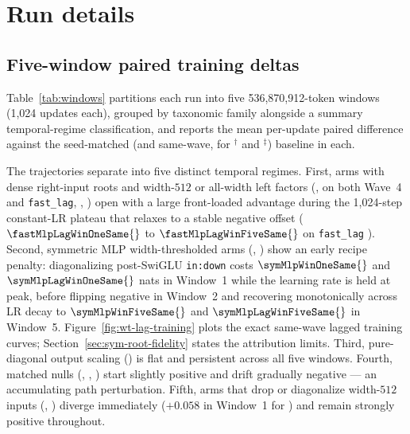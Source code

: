 \section{Run details}
\label{app:runs}

\subsection{Five-window paired training deltas}

Table~\ref{tab:windows} partitions each run into five 536{,}870{,}912-token
windows (1{,}024 updates each), grouped by taxonomic family alongside a
summary temporal-regime classification, and reports the mean per-update paired
difference against the seed-matched (and same-wave, for ${}^{\dagger}$ and
${}^{\ddagger}$) baseline in each.

The trajectories separate into five distinct temporal regimes. First, arms with
dense right-input roots and width-$512$ or all-width left factors
(,  on both Wave~4 and \texttt{fast\_lag},
, ) open with a large front-loaded advantage
during the 1{,}024-step constant-LR plateau that relaxes to a stable negative
offset ($\fastMlpLagWinOneSame{}$ to $\fastMlpLagWinFiveSame{}$ on
\texttt{fast\_lag} ). Second, symmetric MLP width-thresholded
arms (, ) show an early recipe penalty:
diagonalizing post-SwiGLU \texttt{in:down} costs
$\symMlpWinOneSame{}$ and $\symMlpLagWinOneSame{}$ nats in Window~1 while the
learning rate is held at peak, before flipping negative in Window~2 and
recovering monotonically across LR decay to $\symMlpWinFiveSame{}$ and
$\symMlpLagWinFiveSame{}$ in Window~5. Figure~\ref{fig:wt-lag-training} plots
the exact same-wave lagged training curves; Section~\ref{sec:sym-root-fidelity}
states the attribution limits. Third, pure-diagonal output scaling
() is flat and persistent across all five windows. Fourth, matched
nulls (, , ) start slightly
positive and drift gradually negative --- an accumulating path perturbation.
Fifth, arms that drop or diagonalize width-$512$ inputs (,
) diverge immediately ($+0.058$ in Window~1 for
) and remain strongly positive throughout.

\begin{table}[t]
\centering
\caption{Mean per-update paired training-loss difference against seed-matched
 across five consecutive 536{,}870{,}912-token windows, grouped by
the taxonomic families of Table~\ref{tab:arms} ($^{\dagger}$Wave-10 same-wave
frame; $^{\ddagger}$\texttt{wave\_sym\_fastlag} same-wave frame). Negative is
better; shaded rows mark the Pareto-optimal family.}
\label{tab:windows}
\scriptsize\setlength{\tabcolsep}{4.2pt}
\resizebox{\textwidth}{!}{}
\end{table}

